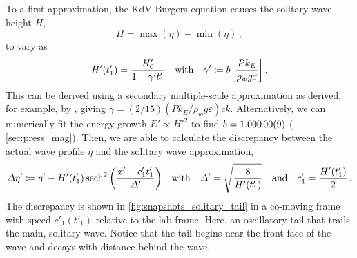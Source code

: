 \documentclass{jfm}
\renewcommand*{\epsilon}{\varepsilon}
\begin{document}
To a first approximation, the KdV-Burgers equation causes the solitary
wave height $H$,
\begin{equation}
  H = \max(\eta) - \min(\eta) \,,
  \label{eq:height_def}
\end{equation}
to vary as
\begin{equation}
  H'(t'_1) = \frac{H'_0}{1 - \gamma' t'_1}
  \qq{with}
  \gamma' \coloneqq b \bqty{\frac{P k_E}{\rho_w g \epsilon}}
  \,.
  \label{eq:height_approx}
\end{equation}
This can be derived using a secondary multiple-scale approximation as
derived, for example, by \citet{zdyrski2019effects}, giving $\gamma =
(2/15) (P k_E/\rho_w g \epsilon) ck$.
Alternatively, we can numerically fit the energy growth $E' \propto
H'^2$ to find $b = \num{1.00000 \pm 0.00009}$ (\cf{}
\cref{sec:press_mag}).
Then, we are able to calculate the discrepancy between the actual wave
profile $\eta$ and the solitary wave approximation,
\begin{equation}
  \Delta \eta' \coloneqq \eta'
    - H'(t'_1) \sech^2\pqty{\frac{x' - c'_1 t'_1}{\Delta'}}
  \qq{with}
  \Delta' = \sqrt{\frac{8}{H'(t'_1)}}
  \qq{and}
  c'_1 = \frac{H'(t'_1)}{2} \,.
  \label{eq:profile_discrepancy}
\end{equation}
The discrepancy is shown in \cref{fig:snapshots_solitary_tail} in a
co-moving frame with speed $c'_1(t'_1)$ relative to the lab frame.
Here, an oscillatory tail that trails the main, solitary wave.
Notice that the tail begins near the front face of the wave and decays
with distance behind the wave.
\end{document}
